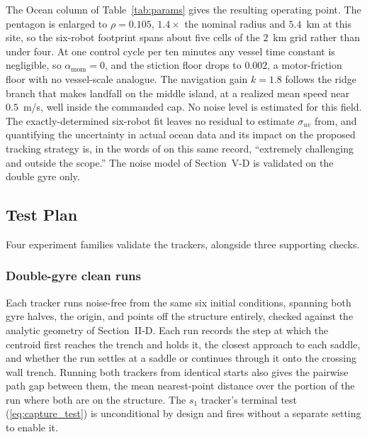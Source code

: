 \documentclass[lettersize,journal]{IEEEtran}
\begin{document}
The Ocean column of Table~\ref{tab:params} gives the resulting
operating point. The pentagon is enlarged to $\rho = 0.105$,
$1.4\times$ the nominal radius and $5.4$~km at this site, so the
six-robot footprint spans about five cells of the $2$~km grid rather
than under four. At one control cycle per ten minutes any vessel time
constant is negligible, so $\alpha_{\text{mom}} = 0$, and the stiction
floor drops to $0.002$, a motor-friction floor with no vessel-scale
analogue. The navigation gain $k = 1.8$ follows the ridge branch that
makes landfall on the middle island, at a realized mean speed near
$0.5$~m/s, well inside the commanded cap. No noise level is estimated
for this field. The exactly-determined six-robot fit leaves no residual
to estimate $\sigma_{uv}$ from, and quantifying the uncertainty in
actual ocean data and its impact on the proposed tracking strategy is,
in the words of \cite{17} on this same record, ``extremely challenging
and outside the scope.'' The noise model of Section~\mbox{V-D} is
validated on the double gyre only.

\subsection{Test Plan}
\label{sec:test_plan}

Four experiment families validate the trackers, alongside three
supporting checks.

\subsubsection{Double-gyre clean runs}
Each tracker runs noise-free from the same six initial conditions,
spanning both gyre halves, the origin, and points off the structure
entirely, checked against the analytic geometry of Section~\mbox{II-D}. Each
run records the step at which the
centroid first reaches the trench and holds it, the closest approach to
each saddle, and whether the run settles at a saddle or continues
through it onto the crossing wall trench. Running both trackers from
identical starts also gives the pairwise path gap between them, the mean
nearest-point distance over the portion of the run where both are on the
structure. The $s_1$ tracker's terminal test (\ref{eq:capture_test}) is
unconditional by design and fires without a separate setting to enable it.
\end{document}
